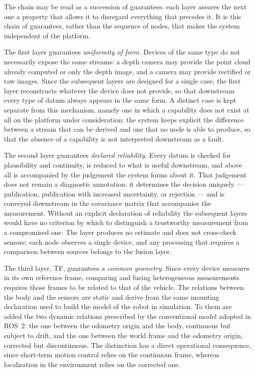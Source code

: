 The chain may be read as a succession of guarantees: each layer assures the next
one a property that allows it to disregard everything that precedes it. It is
this chain of guarantees, rather than the sequence of nodes, that makes the
system independent of the platform.

The first layer guarantees \emph{uniformity of form}. Devices of the same type
do not necessarily expose the same streams: a depth camera may provide the point
cloud already computed or only the depth image, and a camera may provide
rectified or raw images. Since the subsequent layers are designed for a single
case, the first layer reconstructs whatever the device does not provide, so that
downstream every type of datum always appears in the same form. A distinct case
is kept separate from this mechanism, namely one in which a capability does not
exist at all on the platform under consideration: the system keeps explicit the
difference between a stream that can be derived and one that no node is able to
produce, so that the absence of a capability is not interpreted downstream as a
fault.

The second layer guarantees \emph{declared reliability}. Every datum is checked
for plausibility and continuity, is reduced to what is useful downstream, and
above all is accompanied by the judgement the system forms about it. That
judgement does not remain a diagnostic annotation: it determines the decision
uniquely --- publication, publication with increased uncertainty, or
rejection --- and is conveyed downstream in the covariance matrix that
accompanies the measurement. Without an explicit declaration of reliability the
subsequent layers would have no criterion by which to distinguish a trustworthy
measurement from a compromised one. The layer produces no estimate and does not
cross-check sensors: each node observes a single device, and any processing that
requires a comparison between sources belongs to the fusion layer.

The third layer, TF, guarantees a \emph{common geometry}. Since every device measures
in its own reference frame, comparing and fusing heterogeneous measurements
requires those frames to be related to that of the vehicle. The relations
between the body and the sensors are static and derive from the same mounting
declaration used to build the model of the robot in simulation. To them are
added the two dynamic relations prescribed by the conventional model adopted in
ROS~2: the one between the odometry origin and the body, continuous but subject
to drift, and the one between the world frame and the odometry origin, corrected
but discontinuous. The distinction has a direct operational consequence, since
short-term motion control relies on the continuous frame, whereas localisation
in the environment relies on the corrected one.

